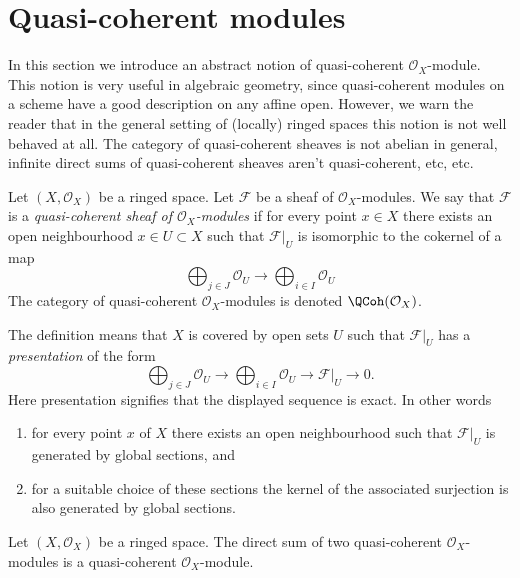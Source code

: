 \section{Quasi-coherent modules}
\label{section-quasi-coherent}

\noindent
In this section we introduce an abstract notion of
quasi-coherent $\mathcal{O}_X$-module. This notion is very
useful in algebraic geometry, since quasi-coherent modules
on a scheme have a good description on any affine open.
However, we warn the reader that
in the general setting of (locally) ringed spaces
this notion is not well behaved at all. The category of
quasi-coherent sheaves is not abelian in general, infinite
direct sums of quasi-coherent sheaves aren't quasi-coherent, etc, etc.

\begin{definition}
\label{definition-quasi-coherent}
Let $(X, \mathcal{O}_X)$ be a ringed space.
Let $\mathcal{F}$ be a sheaf of $\mathcal{O}_X$-modules.
We say that $\mathcal{F}$ is a {\it quasi-coherent
sheaf of $\mathcal{O}_X$-modules} if for every
point $x \in X$ there exists an open neighbourhood
$x\in U \subset X$ such that $\mathcal{F}|_U$
is isomorphic to the cokernel of a map
$$
\bigoplus\nolimits_{j \in J}
\mathcal{O}_U
\longrightarrow
\bigoplus\nolimits_{i \in I}
\mathcal{O}_U
$$
The category of quasi-coherent $\mathcal{O}_X$-modules
is denoted $\QCoh(\mathcal{O}_X)$.
\end{definition}

\noindent
The definition means that $X$ is covered by open sets $U$
such that $\mathcal{F}|_U$ has a {\it presentation}
of the form
$$
\bigoplus\nolimits_{j \in J}
\mathcal{O}_U
\longrightarrow
\bigoplus\nolimits_{i \in I}
\mathcal{O}_U
\longrightarrow
\mathcal{F}|_U
\longrightarrow
0.
$$
Here presentation signifies that the displayed
sequence is exact. In other words
\begin{enumerate}
\item for every point $x$ of $X$ there exists
an open neighbourhood such that $\mathcal{F}|_U$
is generated by global sections, and
\item for a suitable choice of these sections
the kernel of the associated surjection is also
generated by global sections.
\end{enumerate}

\begin{lemma}
\label{lemma-direct-sum-quasi-coherent}
Let $(X, \mathcal{O}_X)$ be a ringed space.
The direct sum of two quasi-coherent $\mathcal{O}_X$-modules is
a quasi-coherent $\mathcal{O}_X$-module.
\end{lemma}

